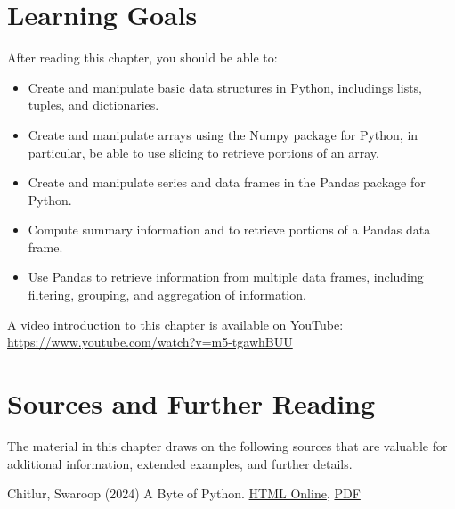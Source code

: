 %
%
\section*{Learning Goals}

After reading this chapter, you should be able to:
\begin{itemize}
   \item Create and manipulate basic data structures in Python, includings lists, tuples, and dictionaries.
   \item Create and manipulate arrays using the Numpy package for Python, in particular, be able to use slicing to retrieve portions of an array.
   \item Create and manipulate series and data frames in the Pandas package for Python.
   \item Compute summary information and to retrieve portions of a Pandas data frame.
   \item Use Pandas to retrieve information from multiple data frames, including filtering, grouping, and aggregation of information.
\end{itemize}

\begin{advanced}
\begin{videobox}
A video introduction to this chapter is available on YouTube:\\

\url{https://www.youtube.com/watch?v=m5-tgawhBUU}
\end{videobox}
\end{advanced}


\section*{Sources and Further Reading}

The material in this chapter draws on the following sources that are valuable for additional information, extended examples, and further details.

\begin{resourcebox}
Chitlur, Swaroop (2024) A Byte of Python. \href{https://python.swaroopch.com/}{HTML Online}, \href{https://github.com/swaroopch/byte-of-python/releases/}{PDF} \\
\end{resourcebox}


